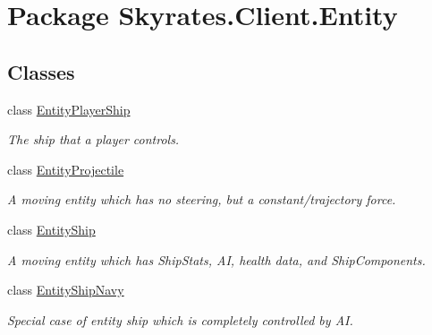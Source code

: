 \hypertarget{namespace_skyrates_1_1_client_1_1_entity}{\section{Package Skyrates.\-Client.\-Entity}
\label{namespace_skyrates_1_1_client_1_1_entity}
}
\subsection*{Classes}
\begin{DoxyCompactItemize}
\item 
class \hyperlink{class_skyrates_1_1_client_1_1_entity_1_1_entity_player_ship}{Entity\-Player\-Ship}
\begin{DoxyCompactList}\small\item\em The ship that a player controls. \end{DoxyCompactList}\item 
class \hyperlink{class_skyrates_1_1_client_1_1_entity_1_1_entity_projectile}{Entity\-Projectile}
\begin{DoxyCompactList}\small\item\em A moving entity which has no steering, but a constant/trajectory force. \end{DoxyCompactList}\item 
class \hyperlink{class_skyrates_1_1_client_1_1_entity_1_1_entity_ship}{Entity\-Ship}
\begin{DoxyCompactList}\small\item\em A moving entity which has Ship\-Stats, A\-I, health data, and Ship\-Components. \end{DoxyCompactList}\item 
class \hyperlink{class_skyrates_1_1_client_1_1_entity_1_1_entity_ship_navy}{Entity\-Ship\-Navy}
\begin{DoxyCompactList}\small\item\em Special case of entity ship which is completely controlled by A\-I. \end{DoxyCompactList}\end{DoxyCompactItemize}
